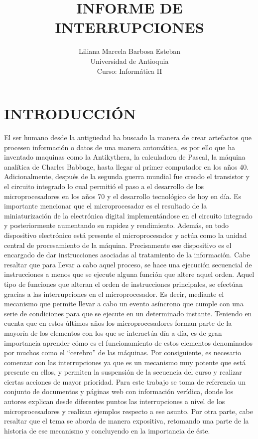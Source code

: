 \documentclass[11pt,letterpaper]{article}
\title{INFORME DE INTERRUPCIONES}
\author{Liliana Marcela Barbosa Esteban\\%
Universidad de Antioquia \\
Curso: Informática II
}
\date{}
\begin{document}
\maketitle
\thispagestyle{empty}
\pagestyle{empty}

\section{INTRODUCCIÓN}
El ser humano desde la antigüedad ha buscado la manera de crear artefactos que procesen información o datos de una manera automática, es por ello que ha inventado maquinas como la Antikythera, la calculadora de Pascal, la máquina analítica de Charles Babbage, hasta llegar al primer computador en los años 40. Adicionalmente, después de la segunda guerra mundial fue creado el transistor y el circuito integrado lo cual permitió el paso a el desarrollo de los microprocesadores en los años 70 y el desarrollo tecnológico de hoy en día.
\newline
\newline
Es importante mencionar que el microprocesador es el resultado de la miniaturización de la electrónica digital implementándose en el circuito integrado y posteriormente aumentando su rapidez y rendimiento. Además, en todo dispositivo electrónico está presente el microprocesador y actúa como la unidad central de procesamiento de la máquina. Precisamente ese dispositivo es el encargado de dar instrucciones asociadas al tratamiento de la información. Cabe resaltar que para llevar a cabo aquel proceso, se hace una ejecución secuencial de instrucciones a menos que se ejecute alguna función que altere aquel orden.
\newline
\newline
Aquel tipo de funciones que alteran el orden de instrucciones principales, se efectúan gracias a las interrupciones en el microprocesador. Es decir, mediante el mecanismo que permite llevar a cabo un evento asíncrono que cumple con una serie de condiciones para que se ejecute en un determinado instante.
\newline
\newline
Teniendo en cuenta que en estos últimos años los microprocesadores forman parte de la mayoría de los elementos con los que se interactúa día a día, es de gran importancia aprender cómo es el funcionamiento de estos elementos denominados por muchos como el “cerebro” de las máquinas. Por consiguiente, es necesario comenzar con las interrupciones ya que es un mecanismo muy potente que está presente en ellos, y permiten la suspensión de la secuencia del curso y realizar ciertas acciones de mayor prioridad. 
\newline
\newline
Para este trabajo se toma de referencia un conjunto de documentos y páginas web con información verídica, donde los autores explican desde diferentes puntos las interrupciones a nivel de los microprocesadores y realizan ejemplos respecto a ese asunto. Por otra parte, cabe resaltar que el tema se aborda de manera expositiva, retomando una parte de la historia de ese mecanismo y concluyendo en la importancia de éste.
\newline
\end{document}
